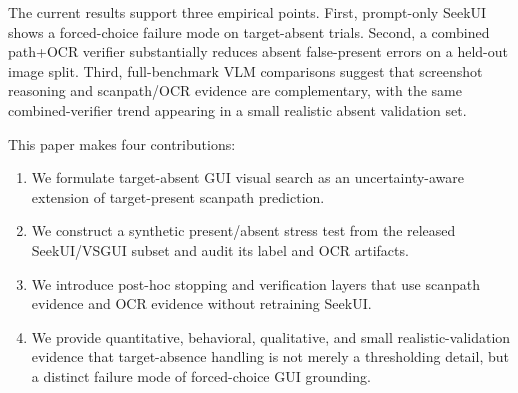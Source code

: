 The current results support three empirical points. First, prompt-only SeekUI shows a forced-choice failure mode on target-absent trials. Second, a combined path+OCR verifier substantially reduces absent false-present errors on a held-out image split. Third, full-benchmark VLM comparisons suggest that screenshot reasoning and scanpath/OCR evidence are complementary, with the same combined-verifier trend appearing in a small realistic absent validation set.

This paper makes four contributions:

\begin{enumerate}
  \item We formulate target-absent GUI visual search as an uncertainty-aware extension of target-present scanpath prediction.
  \item We construct a synthetic present/absent stress test from the released SeekUI/VSGUI subset and audit its label and OCR artifacts.
  \item We introduce post-hoc stopping and verification layers that use scanpath evidence and OCR evidence without retraining SeekUI.
  \item We provide quantitative, behavioral, qualitative, and small realistic-validation evidence that target-absence handling is not merely a thresholding detail, but a distinct failure mode of forced-choice GUI grounding.
\end{enumerate}
